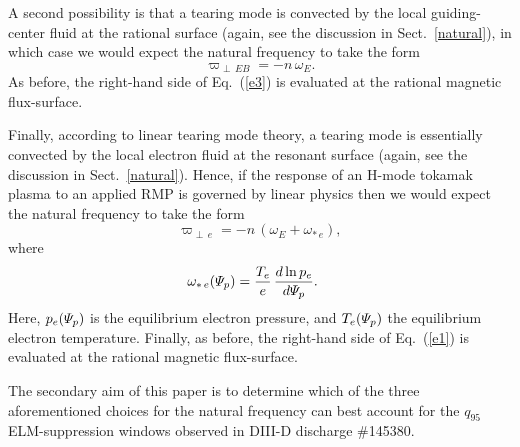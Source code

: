 \documentclass[12pt,prb,aps]{revtex4-1}
\begin{document}
A second possibility is that a tearing mode is convected by the local guiding-center fluid at the rational surface  (again, see the discussion in Sect.~\ref{natural}),\cite{heyn,paz1}
in which case we would expect the natural frequency to take the form 
\begin{equation}\label{e3}
\varpi_{\perp\, EB} =-n\,\omega_E.
\end{equation}
As before, the right-hand side of Eq.~(\ref{e3}) is evaluated
at the rational magnetic flux-surface. 

Finally, according to
linear tearing mode theory, a tearing mode is essentially convected by
the local electron fluid at the resonant surface (again, see the discussion in Sect.~\ref{natural}).\cite{hender,cole} Hence, if the response of an H-mode tokamak plasma to an applied RMP
is governed by linear physics then we would expect the
natural frequency to take the form\,\cite{lin1,lin2,lin3}
\begin{equation}
\varpi_{\perp\,e} = - n\,(\omega_E+\omega_{\ast\,e}),\label{e1}
\end{equation}
where
\begin{align}
\omega_{\ast\,e}({\mit\Psi}_p) &=\frac{T_e}{e}\,\frac{d\ln p_e}{d{\mit\Psi}_p}.
\end{align}
 Here, $p_e({\mit\Psi}_p)$ is the equilibrium
electron pressure, and $T_e({\mit\Psi}_p)$ the equilibrium
electron temperature.
Finally,
as before, the right-hand side of Eq.~(\ref{e1}) is evaluated
at the rational magnetic flux-surface. 

The secondary aim of this paper is to determine which of the three aforementioned choices for the natural frequency can best account for the   $q_{95}$ 
ELM-suppression windows  observed in DIII-D discharge \#145380. 
\end{document}
